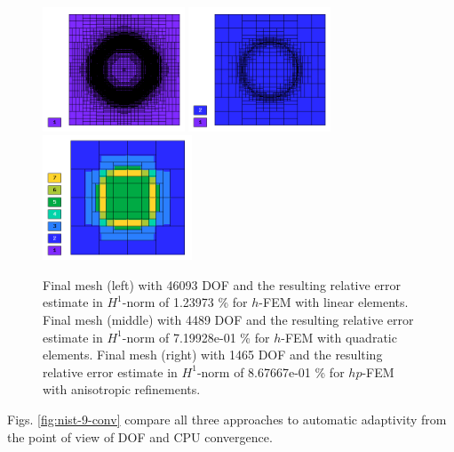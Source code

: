 \begin{figure}[!ht]
\centering
\includegraphics[height=3.7cm]{nist/nist-9/mesh_h1_aniso.png}
\includegraphics[height=3.7cm]{nist/nist-9/mesh_h2_aniso.png}
\includegraphics[height=3.7cm]{nist/nist-9/mesh_hp_aniso.png}
\caption{
Final mesh (left) with 46093 DOF and the resulting
relative error estimate in $H^1$-norm of 1.23973 \% for $h$-FEM with linear elements.
Final mesh (middle) with 4489 DOF and the resulting
relative error estimate in $H^1$-norm of 7.19928e-01 \% for $h$-FEM with quadratic elements.
Final mesh (right) with 1465 DOF and the resulting
relative error estimate in $H^1$-norm of 8.67667e-01 \% for $hp$-FEM with anisotropic refinements.}
\label{fig:nist-9-hp-aniso}
\end{figure}


Figs. \ref{fig:nist-9-conv} compare all
three approaches to automatic adaptivity from the point
of view of DOF and CPU convergence.

